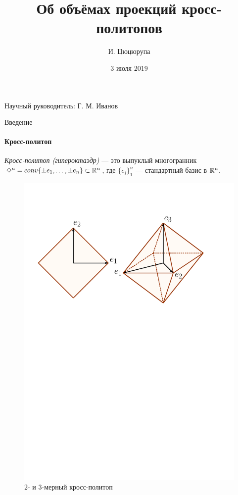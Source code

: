 \documentclass{beamer}
\def\co{\mathop{conv}}
\newcommand{\crosp}{\Diamond}
\begin{document}
\title{Об объёмах проекций кросс-политопов}
\date{3 июля 2019}
\author{И. Цюцюрупа}

\begin{frame}
	\maketitle
	\begin{centering}
		Научный руководитель: Г. М. Иванов
	\end{centering}
\end{frame}

\begin{frame}{Введение}
	\framesubtitle{Кросс-политоп}
	\textit{Кросс-политоп (гипероктаэдр)} --- это выпуклый многогранник $\crosp^n=\co\{\pm e_1,\ldots,\pm e_n\}\subset\RR^n$, где $\{e_i\}_1^n$ --- стандартный базис в $\mathbb {R}^n$.\pause
	\begin{figure}[h!]
		\begin{center}
			\includegraphics[scale=0.45]{pics/crosp.pdf}
			\caption{2- и 3-мерный кросс-политоп}
		\end{center}
	\end{figure}
\end{frame}
\end{document}
